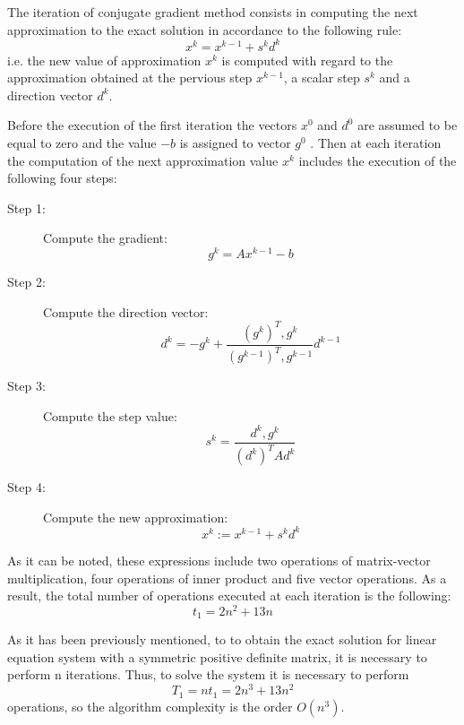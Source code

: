 The iteration of conjugate gradient method consists in computing the next approximation to the exact solution
in accordance to the following rule:
\begin{equation}
  x^k = x^{k-1} + s^k d^k
\end{equation}
i.e. the new value of approximation $x^k$ is computed with regard to the approximation obtained at the pervious step $x^{k-1}$, a scalar step $s^k$ and a direction vector $d^k$.

Before the execution of the first iteration the vectors $x^0$ and $d^0$ are assumed to be equal to zero and the value  $-b$ is assigned to vector $g^0$ . Then at each iteration the computation of the next approximation value $x^k$ includes the execution of the following four steps:
\begin{description}
  \item[Step 1:]  Compute the gradient:
    \begin{equation}
      g^k = Ax^{k-1}-b
    \end{equation}
  \item[Step 2:] Compute the direction vector:
    \begin{equation}
      d^k = -g^k + \frac{(g^k)^T, g^k}{(g^{k-1})^T, g^{k-1}}d^{k-1}
    \end{equation}
  \item[Step 3:] Compute the step value:
    \begin{equation}
      s^k = \frac{d^k, g^k}{(d^k)^T A d^k}
    \end{equation}
  \item[Step 4:] Compute the new approximation:
    \begin{equation}
      x^k := x^{k-1} + s^k d^k
    \end{equation}
\end{description}

As it can be noted, these expressions include two operations of matrix-vector multiplication, four operations of inner product and five vector operations. As a result, the total number of operations executed at each iteration is the following:
\begin{equation}
  t_1 = 2n^2 + 13n
\end{equation}

As it has been previously mentioned, to to obtain the exact solution for linear equation system with a symmetric positive definite matrix, it is necessary to perform n iterations. Thus, to solve the system it is necessary to perform
\begin{equation}
  T_1 = nt_1 = 2n^3 + 13n^2
\end{equation}
operations, so the algorithm complexity is the order $O(n^3)$.

